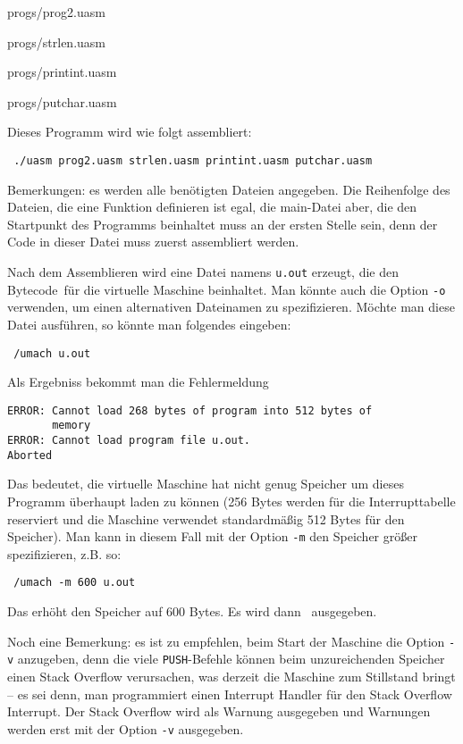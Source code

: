 
                {progs/prog2.uasm}



                {progs/strlen.uasm}



                {progs/printint.uasm}



                {progs/putchar.uasm}


Dieses Programm wird wie folgt assembliert:
\begin{lstlisting}
 ./uasm prog2.uasm strlen.uasm printint.uasm putchar.uasm
\end{lstlisting}
Bemerkungen: es werden alle benötigten Dateien angegeben. Die Reihenfolge des
Dateien, die eine Funktion definieren ist egal, die \glqq main\grqq-Datei aber,
die den Startpunkt des Programms beinhaltet muss an der ersten Stelle
sein, denn der Code in dieser Datei muss zuerst assembliert werden.

Nach dem Assemblieren wird eine Datei namens \texttt{u.out} erzeugt, die den
\glqq Bytecode\grqq\ für die virtuelle Maschine beinhaltet. Man könnte auch die
Option \texttt{-o} verwenden, um einen alternativen Dateinamen zu spezifizieren.
Möchte man diese Datei ausführen, so könnte man folgendes eingeben:
\begin{lstlisting}
 /umach u.out
\end{lstlisting}
Als Ergebniss bekommt man die Fehlermeldung
\begin{lstlisting}
ERROR: Cannot load 268 bytes of program into 512 bytes of
       memory
ERROR: Cannot load program file u.out.
Aborted
\end{lstlisting}
Das bedeutet, die virtuelle Maschine hat nicht genug Speicher um dieses
Programm überhaupt laden zu können (256 Bytes werden für die Interrupttabelle
reserviert und die Maschine verwendet standardmäßig 512 Bytes für den
Speicher). Man kann in diesem Fall mit der Option \texttt{-m} den Speicher
größer spezifizieren, z.B. so:
\begin{lstlisting}
 /umach -m 600 u.out
\end{lstlisting}
Das erhöht den Speicher auf 600 Bytes. Es wird dann \grqq\ ausgegeben.

Noch eine Bemerkung: es ist zu empfehlen, beim Start der Maschine die Option
\texttt{-v} anzugeben, denn die viele \texttt{PUSH}-Befehle können beim
unzureichenden Speicher einen Stack Overflow verursachen, was derzeit die
Maschine zum Stillstand bringt -- es sei denn, man programmiert einen Interrupt
Handler für den Stack Overflow Interrupt. Der Stack Overflow wird als Warnung
ausgegeben und Warnungen werden erst mit der Option \texttt{-v} ausgegeben.
